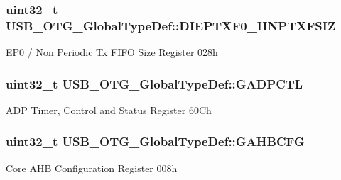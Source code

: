 \subsubsection[{\texorpdfstring{D\+I\+E\+P\+T\+X\+F0\+\_\+\+H\+N\+P\+T\+X\+F\+S\+IZ}{DIEPTXF0_HNPTXFSIZ}}]{ uint32\+\_\+t U\+S\+B\+\_\+\+O\+T\+G\+\_\+\+Global\+Type\+Def\+::\+D\+I\+E\+P\+T\+X\+F0\+\_\+\+H\+N\+P\+T\+X\+F\+S\+IZ}\hypertarget{struct_u_s_b___o_t_g___global_type_def_aa68d26991ddeec06897297c110c11503}{}\label{struct_u_s_b___o_t_g___global_type_def_aa68d26991ddeec06897297c110c11503}
E\+P0 / Non Periodic Tx F\+I\+FO Size Register 028h 
\subsubsection[{\texorpdfstring{G\+A\+D\+P\+C\+TL}{GADPCTL}}]{ uint32\+\_\+t U\+S\+B\+\_\+\+O\+T\+G\+\_\+\+Global\+Type\+Def\+::\+G\+A\+D\+P\+C\+TL}\hypertarget{struct_u_s_b___o_t_g___global_type_def_a82cbf48acaac05bf1e9ed411ecbd7b8b}{}\label{struct_u_s_b___o_t_g___global_type_def_a82cbf48acaac05bf1e9ed411ecbd7b8b}
A\+DP Timer, Control and Status Register 60\+Ch 
\subsubsection[{\texorpdfstring{G\+A\+H\+B\+C\+FG}{GAHBCFG}}]{ uint32\+\_\+t U\+S\+B\+\_\+\+O\+T\+G\+\_\+\+Global\+Type\+Def\+::\+G\+A\+H\+B\+C\+FG}\hypertarget{struct_u_s_b___o_t_g___global_type_def_a212059dc4a38136fee7fb358fc74c0d0}{}\label{struct_u_s_b___o_t_g___global_type_def_a212059dc4a38136fee7fb358fc74c0d0}
Core A\+HB Configuration Register 008h 
